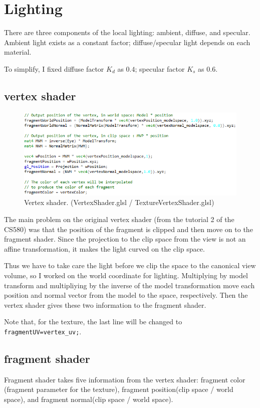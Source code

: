 \documentclass[11pt]{article}
\begin{document}
\section{Lighting} \label{sec:1}
There are three components of the local lighting: ambient, diffuse, and specular.
Ambient light exists as a constant factor; diffuse/specular light depends on each material.

To simplify, I fixed diffuse factor $K_d$ as $0.4$; specular factor $K_s$ as $0.6$.
\newpage
\subsection{vertex shader} \label{ssec:1.1}
\begin{figure}[htb]
	\begin{center}
		\includegraphics[width=0.8\linewidth]{vertexshader.png}
	\end{center}
	\caption{Vertex shader. (VertexShader.glsl / TextureVertexShader.glsl)}
\end{figure}
The main problem on the original vertex shader (from the tutorial 2 of the CS580) was that the position of the fragment is clipped and then move on to the fragment shader.
Since the projection to the clip space from the view is not an affine transformation, it makes the light curved on the clip space.

Thus we have to take care the light before we clip the space to the canonical view volume, so I worked on the world coordinate for lighting.
Multiplying by model transform and multipliying by the inverse of the model transformation move each position and normal vector from the model to the space, respectively.
Then the vertex shader gives these two information to the fragment shader.

Note that, for the texture, the last line will be changed to \texttt{fragmentUV=vertex\_uv;}.

\subsection{fragment shader} \label{ssec:1.2}
Fragment shader takes five information from the vertex shader: fragment color (fragment parameter for the texture), fragment position(clip space / world space), and fragment normal(clip space / world space).
\end{document}
